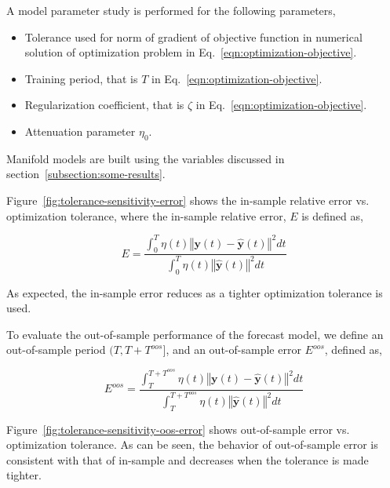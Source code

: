 \documentclass{article}
\begin{document}
A model parameter study is performed for the following parameters,

\begin{itemize}

    \item Tolerance used for norm of gradient of objective function in
      numerical solution of optimization problem in
      Eq.~\ref{eqn:optimization-objective}.
  
    \item Training period, that is $T$ in
      Eq.~\ref{eqn:optimization-objective}.
  
    \item Regularization coefficient, that is $\zeta$ in
      Eq.~\ref{eqn:optimization-objective}.

    \item Attenuation parameter $\eta_{0}$.
      
\end{itemize}

Manifold models are built using the variables discussed in
section~\ref{subsection:some-results}.

Figure~\ref{fig:tolerance-sensitivity-error} shows the in-sample
relative error vs. optimization tolerance, where the in-sample
relative error, $E$ is defined as,

\begin{equation}\label{eqn:in-sample-error}
E = \frac{\int_{0}^{T} \eta(t) \left\Vert \boldsymbol{y}(t) -
  \hat{\boldsymbol{y}}(t) \right\Vert^{2} dt}{\int_{0}^{T} \eta(t) \left\Vert
  \hat{\boldsymbol{y}}(t) \right\Vert^{2} dt}
\end{equation}

As expected, the in-sample error reduces as a tighter optimization
tolerance is used.

To evaluate the out-of-sample performance of the forecast model, we
define an out-of-sample period $(T,T+T^{oos}]$, and an out-of-sample
  error $E^{oos}$, defined as,

\begin{equation}\label{eqn:out-of-sample-error}
E^{oos} = \frac{\int_{T}^{T+T^{oos}} \eta(t) \left\Vert \boldsymbol{y}(t) -
  \hat{\boldsymbol{y}}(t) \right\Vert^{2} dt}{\int_{T}^{T+T^{oos}} \eta(t)
  \left\Vert \hat{\boldsymbol{y}}(t) \right\Vert^{2} dt}
\end{equation}

Figure~\ref{fig:tolerance-sensitivity-oos-error} shows out-of-sample
error vs. optimization tolerance. As can be seen, the behavior of
out-of-sample error is consistent with that of in-sample and decreases
when the tolerance is made tighter.
\end{document}
